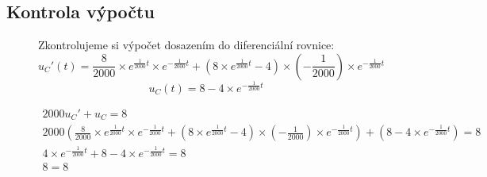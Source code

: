 \subsection{Kontrola výpočtu}
\begin{figure}[H]
Zkontrolujeme si výpočet dosazením do diferenciální rovnice:
$$u_C'(t) = \frac{8}{2000} \times e^{\frac{1}{2000}t} \times e^{-\frac{1}{2000}t} + (8 \times e^{\frac{1}{2000}t} - 4)\times (-\frac{1}{2000})\times e^{-\frac{1}{2000}t}$$
$$u_C(t) = 8 - 4\times e^{-\frac{1}{2000}t}$$

\begin{align*}
2000u_C' + u_C = 8 \\
2000( \frac{8}{2000} \times e^{\frac{1}{2000}t} \times e^{-\frac{1}{2000}t} + (8 \times e^{\frac{1}{2000}t} - 4)\times (-\frac{1}{2000})\times e^{-\frac{1}{2000}t}) + (8 - 4\times e^{-\frac{1}{2000}t}) = 8 \\
4\times e^{-\frac{1}{2000}t} + 8 - 4\times e^{-\frac{1}{2000}t} = 8 \\
8 = 8
\end{align*}
\end{figure}

